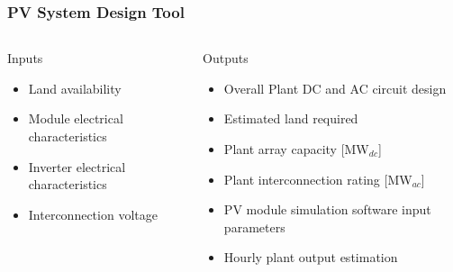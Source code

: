 \documentclass[aspectratio=169]{beamer}
\begin{document}
\begin{frame}
  \frametitle{PV System Design Tool}
  \begin{columns}[t]
    \begin{block}{Inputs}
      \begin{itemize}
      \item Land availability
      \item Module electrical characteristics
      \item Inverter electrical characteristics
      \item Interconnection voltage
      \end{itemize}
    \end{block}

    \begin{block}{Outputs}
      \begin{itemize}
      \item Overall Plant DC and AC circuit design
      \item Estimated land required
      \item Plant array capacity [MW$_{dc}$]
      \item Plant interconnection rating [MW$_{ac}$]
      \item PV module simulation software input parameters
      \item Hourly plant output estimation
      \end{itemize}
    \end{block}
  \end{columns}
\end{frame}

\end{document}
